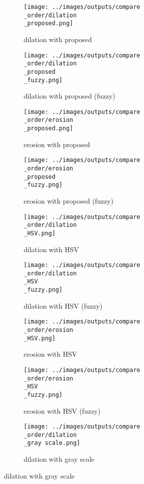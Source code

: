 \begin{figure}[!ht]
   \centering
\begin{subfigure}[t]{0.22\textwidth}
    \texttt{[image: ../images/outputs/compare\\\_order/dilation\\\_proposed.png]}
    \caption{dilation with proposed}
    \centering
  \end{subfigure}
\begin{subfigure}[t]{0.22\textwidth}
    \texttt{[image: ../images/outputs/compare\\\_order/dilation\\\_proposed\\\_fuzzy.png]}
    \caption{dilation with proposed (fuzzy)}
    \centering
  \end{subfigure}
\begin{subfigure}[t]{0.22\textwidth}
    \texttt{[image: ../images/outputs/compare\\\_order/erosion\\\_proposed.png]}
    \caption{erosion with proposed}
    \centering
  \end{subfigure}
\begin{subfigure}[t]{0.22\textwidth}
    \texttt{[image: ../images/outputs/compare\\\_order/erosion\\\_proposed\\\_fuzzy.png]}
    \caption{erosion with proposed (fuzzy)}
    \centering
  \end{subfigure}
\begin{subfigure}[t]{0.22\textwidth}
    \texttt{[image: ../images/outputs/compare\\\_order/dilation\\\_HSV.png]}
    \caption{dilation with HSV}
    \centering
  \end{subfigure}
\begin{subfigure}[t]{0.22\textwidth}
    \texttt{[image: ../images/outputs/compare\\\_order/dilation\\\_HSV\\\_fuzzy.png]}
    \caption{dilation with HSV (fuzzy)}
    \centering
  \end{subfigure}
\begin{subfigure}[t]{0.22\textwidth}
    \texttt{[image: ../images/outputs/compare\\\_order/erosion\\\_HSV.png]}
    \caption{erosion with HSV}
    \centering
  \end{subfigure}
\begin{subfigure}[t]{0.22\textwidth}
    \texttt{[image: ../images/outputs/compare\\\_order/erosion\\\_HSV\\\_fuzzy.png]}
    \caption{erosion with HSV (fuzzy)}
    \centering
  \end{subfigure}
\begin{subfigure}[t]{0.22\textwidth}
    \texttt{[image: ../images/outputs/compare\\\_order/dilation\\\_gray scale.png]}
    \caption{dilation with gray scale}
    \centering

\end{subfigure}
\end{figure}
